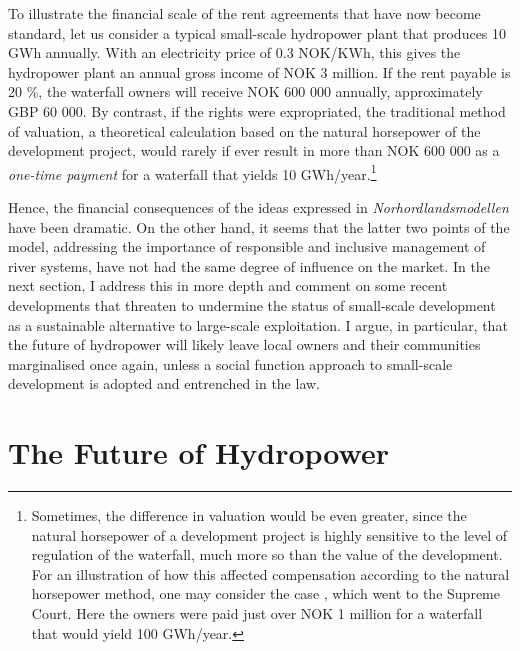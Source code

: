 To illustrate the financial scale of the rent agreements that have now become standard, let us consider a typical small-scale hydropower plant that produces 10 GWh annually. With an electricity price of 0.3 NOK/KWh, this gives the hydropower plant an annual gross income of NOK 3 million. If the rent payable is 20 \%, the waterfall owners will receive NOK 600 000 annually, approximately GBP 60 000. By contrast, if the rights were expropriated, the traditional method of valuation, a theoretical calculation based on the natural horsepower of the development project, would rarely if ever result in more than NOK 600 000 as a {\it one-time payment} for a waterfall that yields 10 GWh/year.\footnote{Sometimes, the difference in valuation would be even greater, since the natural horsepower of a development project is highly sensitive to the level of regulation of the waterfall, much more so than the value of the development. For an illustration of how this affected compensation according to the natural horsepower method, one may consider the case \cite{hellandsfoss97}, which went to the Supreme Court. Here the owners were paid just over NOK 1 million for a waterfall that would yield 100 GWh/year.}

Hence, the financial consequences of the ideas expressed in {\it Norhordlandsmodellen} have been dramatic. On the other hand, it seems that the latter two points of the model, addressing the importance of responsible and inclusive management of river systems, have not had the same degree of influence on the market. In the next section, I address this in more depth and comment on some recent developments that threaten to undermine the status of small-scale development as a sustainable alternative to large-scale exploitation. I argue, in particular, that the future of hydropower will likely leave local owners and their communities marginalised once again, unless a social function approach to small-scale development is adopted and entrenched in the law.

\section{The Future of Hydropower}\label{sec:future}

